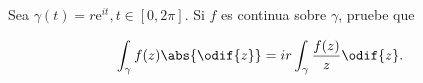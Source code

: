 \documentclass[../main.tex]{subfiles}
\begin{document}
\begin{problema}
    Sea \(\gamma(t) = r \mathrm{e}^{it}, t\in [0, 2\pi]\). Si \(f\) es continua sobre
    \(\gamma\), pruebe que

    \begin{equation}
        \int_{\gamma}^{}f(z)\abs{\odif{z}} = ir \int_{\gamma}^{}\dfrac{f(z)}{z}\odif{z}.
    \end{equation}
\end{problema}
\end{document}
